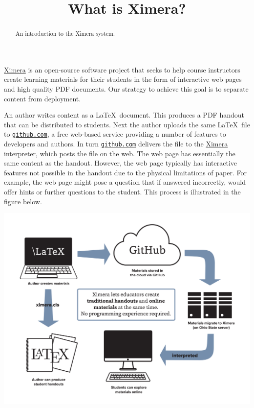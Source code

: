 \documentclass{ximera}
\title{What is Ximera?}
\begin{document}
\begin{abstract}
An introduction to the Ximera system.
\end{abstract}
\maketitle

\href{http://ximera.osu.edu}{\sf Ximera}
is an open-source software project that
seeks to help course instructors create learning materials
for their students in the form of interactive
web pages and high quality PDF documents.
Our strategy to achieve this goal is to separate
content from deployment.

An author writes content as a \LaTeX\ document.
This produces a PDF handout that can be distributed to students.
Next the author uploads the same \LaTeX\ file to
\href{http://github.com}{\tt github.com},
a free web-based service providing a number of features
to developers and authors.
In turn \href{http://github.com}{\tt github.com} delivers
the file to the \href{http://ximera.osu.edu}{\sf Ximera}
interpreter, which posts the file on the web.
The web page has essentially the same content as the handout.
However, the web page typically has interactive features
not possible in the handout due to the physical limitations of paper.
For example, the web page might pose a question
that if answered incorrectly, would offer hints or further questions
to the student.
This process is illustrated in the figure below.

\begin{image}
\includegraphics[scale=.25]{XimeraGraphic.png}
\end{image}
\end{document}
